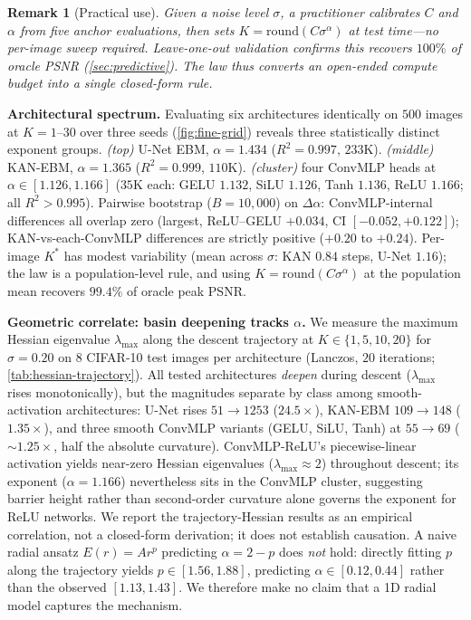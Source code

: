 \documentclass{article}
\newtheorem{remark}{Remark}
\begin{document}
\begin{remark}[Practical use]
Given a noise level $\sigma$, a practitioner calibrates $C$ and $\alpha$ from five anchor evaluations, then sets $K = \mathrm{round}(C\sigma^\alpha)$ at test time---no per-image sweep required. Leave-one-out validation confirms this recovers $100\%$ of oracle PSNR (\cref{sec:predictive}). The law thus converts an open-ended compute budget into a single closed-form rule.
\end{remark}

\textbf{Architectural spectrum.} Evaluating six architectures identically on $500$ images at $K{=}1$--$30$ over three seeds (\cref{fig:fine-grid}) reveals three statistically distinct exponent groups. \emph{(top)} U-Net EBM, $\alpha{=}1.434$ ($R^2{=}0.997$, $233$K). \emph{(middle)} KAN-EBM, $\alpha{=}1.365$ ($R^2{=}0.999$, $110$K). \emph{(cluster)} four ConvMLP heads at $\alpha \in [1.126, 1.166]$ ($35$K each: GELU $1.132$, SiLU $1.126$, Tanh $1.136$, ReLU $1.166$; all $R^2{>}0.995$). Pairwise bootstrap ($B{=}10{,}000$) on $\Delta\alpha$: ConvMLP-internal differences all overlap zero (largest, ReLU--GELU $+0.034$, CI $[-0.052, +0.122]$); KAN-vs-each-ConvMLP differences are strictly positive ($+0.20$ to $+0.24$). Per-image $K^*$ has modest variability (mean across $\sigma$: KAN $0.84$ steps, U-Net $1.16$); the law is a population-level rule, and using $K{=}\mathrm{round}(C\sigma^\alpha)$ at the population mean recovers $99.4\%$ of oracle peak PSNR.

\textbf{Geometric correlate: basin deepening tracks $\alpha$.} We measure the maximum Hessian eigenvalue $\lambda_{\max}$ along the descent trajectory at $K \in \{1, 5, 10, 20\}$ for $\sigma{=}0.20$ on $8$ CIFAR-10 test images per architecture (Lanczos, $20$ iterations; \cref{tab:hessian-trajectory}). All tested architectures \emph{deepen} during descent ($\lambda_{\max}$ rises monotonically), but the magnitudes separate by class among smooth-activation architectures: U-Net rises $51 \!\to\! 1253$ ($24.5{\times}$), KAN-EBM $109 \!\to\! 148$ ($1.35{\times}$), and three smooth ConvMLP variants (GELU, SiLU, Tanh) at $55 \!\to\! 69$ ($\sim$$1.25{\times}$, half the absolute curvature). ConvMLP-ReLU's piecewise-linear activation yields near-zero Hessian eigenvalues ($\lambda_{\max}{\approx}2$) throughout descent; its exponent ($\alpha{=}1.166$) nevertheless sits in the ConvMLP cluster, suggesting barrier height rather than second-order curvature alone governs the exponent for ReLU networks. We report the trajectory-Hessian results as an empirical correlation, not a closed-form derivation; it does not establish causation. A naive radial ansatz $E(r){=}Ar^p$ predicting $\alpha{=}2{-}p$ does \emph{not} hold: directly fitting $p$ along the trajectory yields $p \in [1.56, 1.88]$, predicting $\alpha \in [0.12, 0.44]$ rather than the observed $[1.13, 1.43]$. We therefore make no claim that a 1D radial model captures the mechanism.
\end{document}
